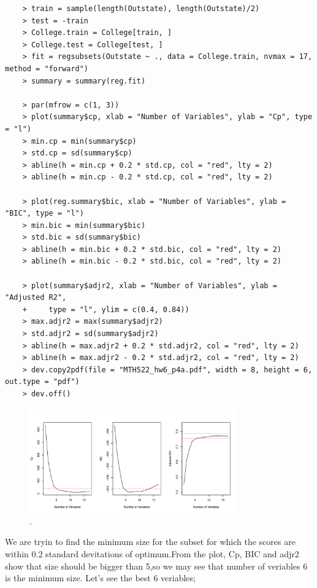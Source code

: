 \documentclass{article}
\begin{document}
\begin{program}
	\begin{verbatim}
	> train = sample(length(Outstate), length(Outstate)/2)
	> test = -train
	> College.train = College[train, ]
	> College.test = College[test, ]
	> fit = regsubsets(Outstate ~ ., data = College.train, nvmax = 17, method = "forward")
	> summary = summary(reg.fit)

	> par(mfrow = c(1, 3))
	> plot(summary$cp, xlab = "Number of Variables", ylab = "Cp", type = "l")
	> min.cp = min(summary$cp)
	> std.cp = sd(summary$cp)
	> abline(h = min.cp + 0.2 * std.cp, col = "red", lty = 2)
	> abline(h = min.cp - 0.2 * std.cp, col = "red", lty = 2)

	> plot(reg.summary$bic, xlab = "Number of Variables", ylab = "BIC", type = "l")
	> min.bic = min(summary$bic)
	> std.bic = sd(summary$bic)
	> abline(h = min.bic + 0.2 * std.bic, col = "red", lty = 2)
	> abline(h = min.bic - 0.2 * std.bic, col = "red", lty = 2)

	> plot(summary$adjr2, xlab = "Number of Variables", ylab = "Adjusted R2",
	+     type = "l", ylim = c(0.4, 0.84))
	> max.adjr2 = max(summary$adjr2)
	> std.adjr2 = sd(summary$adjr2)
	> abline(h = max.adjr2 + 0.2 * std.adjr2, col = "red", lty = 2)
	> abline(h = max.adjr2 - 0.2 * std.adjr2, col = "red", lty = 2)
	> dev.copy2pdf(file = "MTH522_hw6_p4a.pdf", width = 8, height = 6, out.type = "pdf")
	> dev.off()
	\end{verbatim}
\end{program}



\begin{figure}[htb]
	\begin{center}
		\includegraphics[width=0.8\textwidth]{MTH522_hw6_p4a.pdf}
	\end{center}
	\caption{.}
	\label{fig:MTH522_hw6_p4a}
\end{figure}


We are tryin to find the minimum size for the subset for which the scores are within 0.2 standard devitations of optimum.From the plot, Cp, BIC and adjr2 show that size should be bigger than 5,so we may see that number of veriables 6 is the minimum size. Let's see the best 6 veriables;
\end{document}
